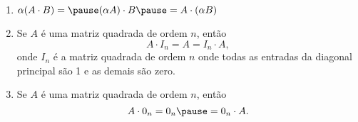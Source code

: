 \documentclass{beamer}
\begin{document}
    \begin{frame}
        \begin{proposicao}
            \begin{enumerate}[label={\roman*})]
                \conti
                \item $\alpha(A\cdot B) = \pause (\alpha A)\cdot B \pause = A \cdot(\alpha B)$\pause
                \item Se $A$ é uma matriz quadrada de ordem $n$, \pause então \[A\cdot I_n = A = I_n\cdot A,\] \pause onde $I_n$ é a matriz quadrada de ordem $n$ \pause onde todas as entradas da diagonal principal são 1 \pause e as demais são zero.\pause
                \item Se $A$ é uma matriz quadrada de ordem $n$, \pause então \[A\cdot0_n = 0_n \pause = 0_n\cdot A.\]
	    \end{enumerate}
        \end{proposicao}
    \end{frame}
\end{document}
